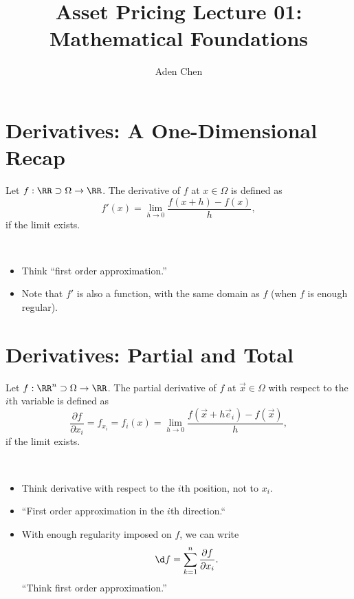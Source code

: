 \documentclass[oneside,reqno,letterpaper]{amsart}
\title[AP-Lec01]{Asset Pricing Lecture 01: Mathematical Foundations}
\author{Aden Chen}
\begin{document}
\maketitle

\tableofcontents

\section{Derivatives: A One-Dimensional Recap}

\begin{definition}
  Let \(f: \RR \supset \Omega \to \RR\). 
  The derivative of \(f\) at \(x \in \Omega\) is defined as 
  \[
    f'(x) = \lim_{h \to 0} \frac{f(x + h) - f(x)}{h} , 
  \] 
  if the limit exists. 
\end{definition}
\begin{remark}~
  \begin{itemize}
    \item Think ``first order approximation.''
    \item Note that \(f'\) is also a function, with the same domain as \(f\) (when \(f\) is enough regular). 
  \end{itemize}
\end{remark}



\section{Derivatives: Partial and Total}
\begin{definition}
  Let \(f: \RR^n \supset \Omega \to \RR\). 
  The partial derivative of \(f\) at \(\vec{x} \in \Omega\) with respect to the \(i\)th variable is defined as 
  \[
    \frac{\partial f}{\partial x_i}
    = f_{x_i}
    = f_i(x) 
    = \lim_{h \to 0} \frac{f(\vec{x} + h \vec{e}_i) - f(\vec{x})}{h} , 
  \] 
  if the limit exists. 
\end{definition}
\begin{remark}~
  \begin{itemize}
    \item Think derivative with respect to the \(i\)th position, not to \(x_i\). 
    \item ``First order approximation in the \(i\)th direction.``
    \item With enough regularity imposed on \(f\), we can write 
      \[
        \d f = \sum_{k = 1}^{n} \frac{\partial f}{\partial x_i} . 
      \] 
      ``Think first order approximation.''
  \end{itemize}
\end{remark}
\end{document}
